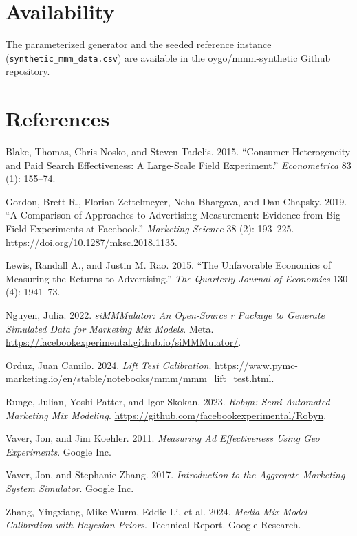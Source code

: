 \documentclass[
  conference]{IEEEtran}
\newlength{\cslhangindent}
\newenvironment{CSLReferences}[2] %
 {\begin{list}{}{%
  \setlength{\itemindent}{0pt}
  \setlength{\leftmargin}{0pt}
  \setlength{\parsep}{0pt}
  \ifodd #1
   \setlength{\leftmargin}{\cslhangindent}
   \setlength{\itemindent}{-1\cslhangindent}
  \fi
  \setlength{\itemsep}{#2\baselineskip}}}
 {\end{list}}
\begin{document}
\section{Availability}\label{availability}

The parameterized generator and the seeded reference instance
(\texttt{synthetic\_mmm\_data.csv}) are available in the
\href{https://github.com/oygo/mmm-synthetic}{oygo/mmm-synthetic Github
repository}.

\section*{References}\label{references}

\protect{}\label{refs}
\begin{CSLReferences}{1}{1}
Blake, Thomas, Chris Nosko, and Steven Tadelis. 2015. {``Consumer
Heterogeneity and Paid Search Effectiveness: A Large-Scale Field
Experiment.''} \emph{Econometrica} 83 (1): 155--74.

Gordon, Brett R., Florian Zettelmeyer, Neha Bhargava, and Dan Chapsky.
2019. {``A Comparison of Approaches to Advertising Measurement: Evidence
from Big Field Experiments at {Facebook}.''} \emph{Marketing Science} 38
(2): 193--225. \url{https://doi.org/10.1287/mksc.2018.1135}.

Lewis, Randall A., and Justin M. Rao. 2015. {``The Unfavorable Economics
of Measuring the Returns to Advertising.''} \emph{The Quarterly Journal
of Economics} 130 (4): 1941--73.

Nguyen, Julia. 2022. \emph{siMMMulator: An Open-Source r Package to
Generate Simulated Data for Marketing Mix Models}. Meta.
\url{https://facebookexperimental.github.io/siMMMulator/}.

Orduz, Juan Camilo. 2024. \emph{Lift Test Calibration}.
\url{https://www.pymc-marketing.io/en/stable/notebooks/mmm/mmm_lift_test.html}.

Runge, Julian, Yoshi Patter, and Igor Skokan. 2023. \emph{Robyn:
Semi-Automated Marketing Mix Modeling}.
\url{https://github.com/facebookexperimental/Robyn}.

Vaver, Jon, and Jim Koehler. 2011. \emph{Measuring Ad Effectiveness
Using Geo Experiments}. Google Inc.

Vaver, Jon, and Stephanie Zhang. 2017. \emph{Introduction to the
Aggregate Marketing System Simulator}. Google Inc.

Zhang, Yingxiang, Mike Wurm, Eddie Li, et al. 2024. \emph{Media Mix
Model Calibration with {Bayesian} Priors}. Technical Report. Google
Research.

\end{CSLReferences}
\end{document}
